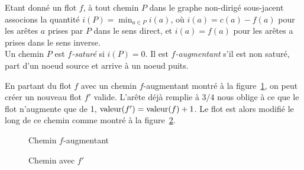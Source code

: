 \begin{mydef}
  Etant donné un flot $f$, à tout chemin $P$ dans le graphe non-dirigé sous-jacent associons la quantité $i(P) = \min_{a \in P} i(a)$, où $i(a) = c(a) − f(a)$ pour les arêtes $a$ prises par $P$ dans le sens direct, et $i(a) = f (a)$ pour les arêtes a prises dans le sens inverse.\\
  Un chemin $P$ est \emph{$f$-saturé} si $i(P) = 0$. Il est \emph{$f$-augmentant} s'il est non saturé, part d'un noeud source et arrive à un noeud puits.
\end{mydef}

\begin{myexem}
  En partant du flot $f$ avec un chemin $f$-augmentant
  montré à la figure~\ref{fig:faug},
  on peut créer un nouveau flot $f'$ valide.
  L'arête déjà remplie à $3/4$ nous oblige à ce que le flot n'augmente que de 1,
  $\operatorname{valeur}(f') = \operatorname{valeur}(f) + 1$.
  Le flot est alors modifié le long de ce chemin comme montré
  à la figure~\ref{fig:fprime}.
  \begin{figure}[h!]
    \centering
    \caption{Chemin $f$-augmentant}
    \label{fig:faug}
  \end{figure}
  \begin{figure}[h!]
    \centering
    \caption{Chemin avec $f'$}
    \label{fig:fprime}
  \end{figure}
\end{myexem}


